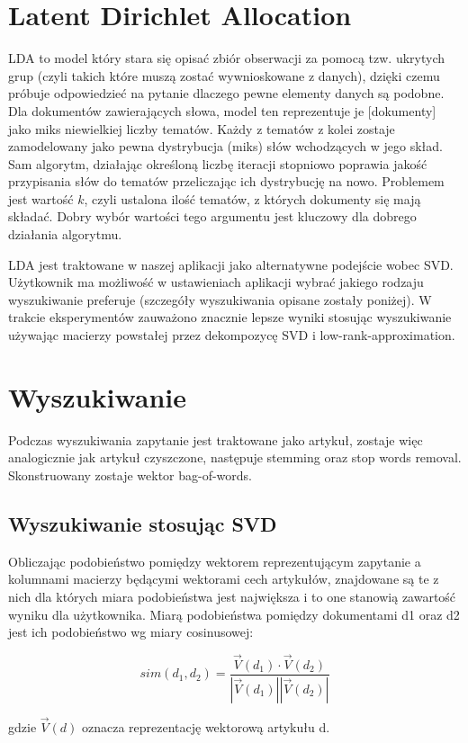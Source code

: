 \section{Latent Dirichlet Allocation}
LDA to model który stara się opisać zbiór obserwacji za pomocą tzw. ukrytych grup (czyli takich które muszą zostać wywnioskowane z danych), dzięki czemu próbuje odpowiedzieć na pytanie dlaczego pewne elementy danych są podobne. Dla dokumentów zawierających słowa, model ten reprezentuje je [dokumenty] jako miks niewielkiej liczby tematów. Każdy z tematów z kolei zostaje zamodelowany jako pewna dystrybucja (miks) słów wchodzących w jego skład. Sam algorytm, działając określoną liczbę iteracji stopniowo poprawia jakość przypisania słów do tematów przeliczając ich dystrybucję na nowo. Problemem jest wartość $k$, czyli ustalona ilość tematów, z których dokumenty się mają składać. Dobry wybór wartości tego argumentu jest kluczowy dla dobrego działania algorytmu.

LDA jest traktowane w naszej aplikacji jako alternatywne podejście wobec SVD. Użytkownik ma możliwość w ustawieniach aplikacji wybrać jakiego rodzaju wyszukiwanie preferuje (szczegóły wyszukiwania opisane zostały poniżej). W trakcie eksperymentów zauważono znacznie lepsze wyniki stosując wyszukiwanie używając macierzy powstałej przez dekompozycę SVD i low-rank-approximation.

\section{Wyszukiwanie}
Podczas wyszukiwania zapytanie jest traktowane jako artykuł, zostaje więc analogicznie jak artykuł czyszczone, następuje stemming oraz stop words removal. Skonstruowany zostaje wektor bag-of-words. 

\subsection{Wyszukiwanie stosując SVD}
Obliczając podobieństwo pomiędzy wektorem reprezentującym zapytanie a kolumnami macierzy będącymi wektorami cech artykułów, znajdowane są te z nich dla których miara podobieństwa jest największa i to one stanowią zawartość wyniku dla użytkownika.
Miarą podobieństwa pomiędzy dokumentami d1 oraz d2 jest ich podobieństwo wg miary cosinusowej:

$$sim(d_1, d_2) = \frac{\vec{V} (d_1) \cdot \vec{V} (d_2)}{| \vec{V} (d_1) | | \vec{V} (d_2) | }$$

gdzie $\vec{V} (d)$ oznacza reprezentację wektorową artykułu d.\\

